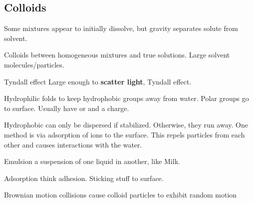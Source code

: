\begin{mdframed}\subsection{Colloids}
\begin{multicols}{2}

    Some mixtures appear to initially dissolve, but gravity separates solute
    from solvent.
    \begin{compactdesc}
    \item[Colloids] between homogeneous mixtures and true solutions. Large
        solvent molecules/particles.
    \item[Tyndall effect] Large enough to \textbf{scatter light}, Tyndall
        effect.
    \item[Hydrophilic] folds to keep hydrophobic groups away from water.
        Polar groups go to surface. Usually have  or  and a charge.
    \item[Hydrophobic] can only be dispersed if stabilized. Otherwise, they
        run away. One method is via adsorption of ions to the surface. This
        repels particles from each other and causes interactions with the water.
    \item[Emulsion] a suspension of one liquid in another, like Milk.
    \item[Adsorption] think adhesion. Sticking stuff to surface.
    \item[Brownian motion] collisions cause colloid particles to exhibit random
        motion
\end{compactdesc}\end{multicols}\end{mdframed}



